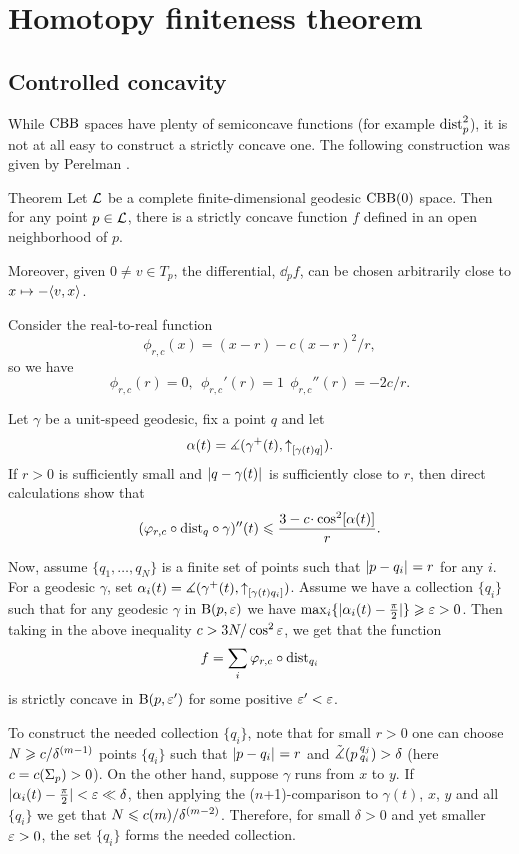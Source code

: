 \chapter{Homotopy finiteness theorem}

\section{Controlled concavity}

While $\mathrm{CBB}$ spaces have plenty of semiconcave functions (for example $\mathrm{dist}_p^2$), 
it is not at all easy to construct a strictly concave one. 
The following construction was given by Perelman \cite{perelman1993,perelman1994}.


\begin{thm}{Theorem}
\label{thm:strictly-concave}
Let $\mathcal{L}$ be a complete finite-dimensional geodesic $\mathrm{CBB}(0)$ space.
Then for any point $p\in \mathcal{L}$, there is  a strictly concave function $f$ defined in an
open neighborhood of $p$.

Moreover, given $0\ne v\in T_p$, the differential, $\dd_p f$, can be chosen
arbitrarily close to $x\mapsto -\langle v,x\rangle$.
\end{thm}



Consider the real-to-real function 
$$\phi_{r,c}(x)=(x-r)- c{(x-r)^2}/r,$$
so we have 
$$\phi_{r,c}(r)=0,\ \ \phi_{r,c}'(r)=1\ \ \phi_{r,c}''(r)=- {2c}/{r}.$$ 

Let $\gamma$ be a unit-speed geodesic, fix a point $q$ and let 
$$\alpha(t)=\measuredangle(\gamma^+(t),{\uparrow}_{[{\gamma(t)}{q}]}).$$
If $r>0$ is sufficiently small and $\dist q{\gamma(t)}{}$ is sufficiently close to
$r$, then direct calculations show that
$$(\phi_{r,c}\circ\distfun_q\circ\gamma)''(t)
\le 
\frac{3-c\cdot \cos^2[\alpha(t)]}{r}.$$

Now, assume $\{q_1,\dots, q_N\}$ is a finite set of points such that $\dist p{q_i}{}=r$ for any $i$. 
For a geodesic $\gamma$, set $\alpha_i(t)=\measuredangle(\gamma^+(t),{\uparrow}_{[{\gamma(t)}{q_i}]})$. 
Assume we have a collection $\{q_i\}$ such
that for any geodesic $\gamma$ in $\mathrm{B}{}(p,\varepsilon)$
we have $\max_i\{|\alpha_i(t)-\tfrac\pi2|\}\geqslant\varepsilon>0$. 
Then taking in the above inequality $c>3N/\cos^2\varepsilon$, we get that the function
$$f=\sum_i \varphi_{r,c}\circ\mathrm{dist}_{q_i}$$
is strictly concave in $\mathrm{B}{}(p,\varepsilon')$ for some positive $\varepsilon'<\varepsilon$.

To construct the needed collection $\{q_i\}$, note that for small $r>0$ one can
choose $N\geqslant c/\delta^{(m-1)}$ points $\{q_i\}$ such that $\dist{p}{q_i}{}=r$
and $\tilde\measuredangle(p\,{}^{q_j}_{q_i})>\delta$ (here $c=c(\Sigma_p)>0$).
On the other hand, suppose $\gamma$ runs from $x$ to $y$.
If $|\alpha_i(t)- \tfrac\pi2|<\varepsilon\ll\delta$, then applying the ($n$+1)-comparison to $\gamma(t)$, $x$, $y$ and all $\{q_i\}$ we get that
$N\leqslant c(m)/\delta^{(m-2)}$. 
Therefore, for small $\delta>0$ and yet smaller $\varepsilon>0$, the set $\{q_i\}$ forms the needed collection.

